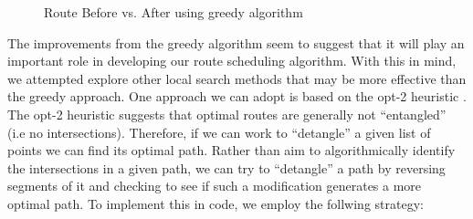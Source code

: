 \documentclass[letterpaper]{article}
\begin{document}
    \begin{figure}[h]
        \caption{Route Before vs. After using greedy algorithm}
        \label{figure:greedy_method}
        \begin{minipage}{0.45\linewidth}
        \end{minipage}
        \begin{minipage}{0.5\linewidth}
        \end{minipage}

    \end{figure}

    The improvements from the greedy algorithm seem to suggest that it 
    will play an important role in developing our route scheduling 
    algorithm. With this in mind, we attempted explore other local search methods that may be more effective than the greedy approach. One approach we can adopt is based on the opt-2 
    heuristic \cite[p.~457]{cite:eijkhout2022}. The opt-2 heuristic suggests that optimal routes are generally 
    not “entangled” (i.e no intersections). Therefore, if we can work to “detangle” 
    a given list of points we can find its optimal path. Rather than aim to algorithmically identify the intersections in a given path, 
    we can try to “detangle” a path by reversing segments of it and checking to 
    see if such a modification generates a more optimal path. To implement this in code, we employ the follwing strategy:
    
\end{document}
